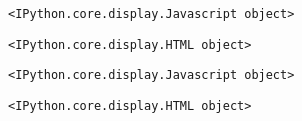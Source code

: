 \documentclass[11pt]{article}
\begin{document}
    
    \begin{verbatim}
<IPython.core.display.Javascript object>
    \end{verbatim}

    
    
    \begin{verbatim}
<IPython.core.display.HTML object>
    \end{verbatim}

    
    
    \begin{verbatim}
<IPython.core.display.Javascript object>
    \end{verbatim}

    
    
    \begin{verbatim}
<IPython.core.display.HTML object>
    \end{verbatim}
\end{document}
